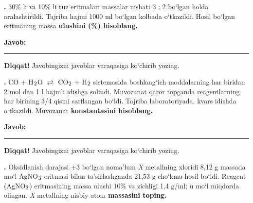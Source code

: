 \documentclass[11pt,a4paper]{article}
\renewcommand{\textsubscript}[1]{\ensuremath{_{\text{\fontsize{8}{8}\selectfont #1}}}}
\newcommand{\qn}[1]{\textbf{\fontsize{11.5}{13}\selectfont #1}}
\newcommand{\qsep}{\par\vspace{13pt}}
\newcommand{\javob}{\par\nopagebreak[4]\smallskip\noindent\textbf{Javob:} \rule[-2pt]{7.5cm}{0.4pt}\par\smallskip\noindent\textbf{Diqqat!} Javobingizni javoblar varaqasiga ko`chirib yozing.\par\medskip}
\begin{document}
\noindent\setlength{\fboxsep}{0pt}
\par\bigskip
\noindent\qn{36.} 30\% li va 10\% li tuz eritmalari massalar nisbati 3 : 2 bo`lgan holda aralashtirildi. Tajriba hajmi 1000 ml bo`lgan kolbada o`tkazildi. Hosil bo`lgan eritmaning massa \textbf{ulushini (\%) hisoblang.}
\javob\qsep
\noindent\qn{37.} CO + H\textsubscript{2}O $\rightleftarrows$ CO\textsubscript{2} + H\textsubscript{2} sistemasida boshlang`ich moddalarning har biridan 2 mol dan 1 l hajmli idishga solindi. Muvozanat qaror topganda reagentlarning har birining 3/4 qismi sarflangan bo`ldi. Tajriba laboratoriyada, kvars idishda o`tkazildi. Muvozanat \textbf{konstantasini hisoblang.}
\javob\qsep
\noindent\qn{38.} Oksidlanish darajasi +3 bo`lgan noma'lum \textit{X} metallning xloridi 8,12 g massada mo`l AgNO\textsubscript{3} eritmasi bilan ta'sirlashganda 21,53 g cho`kma hosil bo`ldi. Reagent (AgNO\textsubscript{3}) eritmasining massa ulushi 10\% va zichligi 1,4 g/ml; u mo`l miqdorda olingan. \textit{X} metallning nisbiy atom \textbf{massasini toping.}
\end{document}
